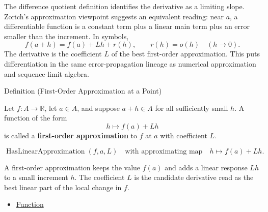 \begin{exposition}
The difference quotient definition identifies the derivative as a limiting
slope. Zorich's approximation viewpoint suggests an equivalent reading: near
$a$, a differentiable function is a constant term plus a linear main term plus
an error smaller than the increment. In symbols,
\[
  f(a+h)=f(a)+Lh+r(h),
  \qquad r(h)=o(h)\quad (h\to 0).
\]
The derivative is the coefficient $L$ of the best first-order approximation.
This puts differentiation in the same error-propagation lineage as numerical
approximation and sequence-limit algebra.
\end{exposition}

\begin{definitionbox}{Definition (First-Order Approximation at a Point)}
\begin{definition}
\label{def:first-order-approximation-at-a-point}
Let $f:A\to\mathbb{R}$, let $a\in A$, and suppose $a+h\in A$ for all
sufficiently small $h$. A function of the form
\[
  h\longmapsto f(a)+Lh
\]
is called a \textbf{first-order approximation} to $f$ at $a$ with coefficient
$L$.
\end{definition}
\end{definitionbox}

\begin{remark*}
\[
\operatorname{HasLinearApproximation}(f,a,L)
\quad\text{with approximating map}\quad
h\mapsto f(a)+Lh.
\]
\end{remark*}

\begin{remark*}[Interpretation]
A first-order approximation keeps the value $f(a)$ and adds a linear response
$Lh$ to a small increment $h$. The coefficient $L$ is the candidate derivative
read as the best linear part of the local change in $f$.
\end{remark*}

\begin{dependencies}
\begin{itemize}
  \item \hyperref[def:function]{Function}
\end{itemize}
\end{dependencies}

